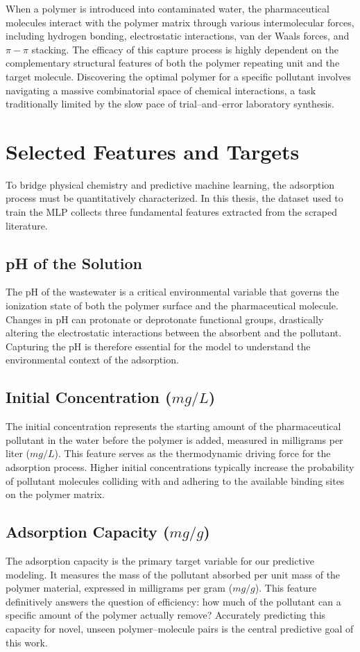 When a polymer is introduced into contaminated water, the pharmaceutical molecules interact with the polymer matrix through various intermolecular forces, including hydrogen bonding, electrostatic interactions, van der Waals forces, and $\pi-\pi$ stacking.  The efficacy of this capture process is highly dependent on the complementary structural features of both the polymer repeating unit and the target molecule. Discovering the optimal polymer for a specific pollutant involves navigating a massive combinatorial space of chemical interactions, a task traditionally limited by the slow pace of trial--and--error laboratory synthesis.

\section{Selected Features and Targets}
\label{sec:selected_features}

To bridge physical chemistry and predictive machine learning, the adsorption process must be quantitatively characterized.  In this thesis, the dataset used to train the MLP collects three fundamental features extracted from the scraped literature.

\subsection*{pH of the Solution}
The pH of the wastewater is a critical environmental variable that governs the ionization state of both the polymer surface and the pharmaceutical molecule. Changes in pH can protonate or deprotonate functional groups, drastically altering the electrostatic interactions between the absorbent and the pollutant. Capturing the pH is therefore essential for the model to understand the environmental context of the adsorption.

\subsection*{Initial Concentration ($mg/L$)}
The initial concentration represents the starting amount of the pharmaceutical pollutant in the water before the polymer is added, measured in milligrams per liter ($mg/L$). This feature serves as the thermodynamic driving force for the adsorption process. Higher initial concentrations typically increase the probability of pollutant molecules colliding with and adhering to the available binding sites on the polymer matrix.

\subsection*{Adsorption Capacity ($mg/g$)}
The adsorption capacity is the primary target variable for our predictive modeling. It measures the mass of the pollutant absorbed per unit mass of the polymer material, expressed in milligrams per gram ($mg/g$).  This feature definitively answers the question of efficiency: how much of the pollutant can a specific amount of the polymer actually remove? Accurately predicting this capacity for novel, unseen polymer--molecule pairs is the central predictive goal of this work.

